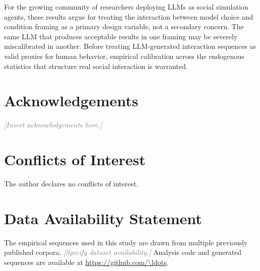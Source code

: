 \documentclass[11pt]{article}
\newcommand{\placeholder}[1]{\textcolor{gray}{\textit{[#1]}}}
\begin{document}
For the growing community of researchers deploying LLMs as social simulation
agents, these results argue for treating the interaction between model choice
and condition framing as a primary design variable, not a secondary concern.
The same LLM that produces acceptable results in one framing may be
severely miscalibrated in another. Before treating LLM-generated interaction
sequences as valid proxies for human behavior, empirical calibration across
the endogenous statistics that structure real social interaction is warranted.

\section*{Acknowledgements}

\placeholder{Insert acknowledgements here.}

\section*{Conflicts of Interest}

The author declares no conflicts of interest.

\section*{Data Availability Statement}

The empirical sequences used in this study are drawn from multiple
previously published corpora. \placeholder{Specify dataset availability.}
Analysis code and generated sequences are available at
\url{https://github.com/\ldots}.



\end{document}
